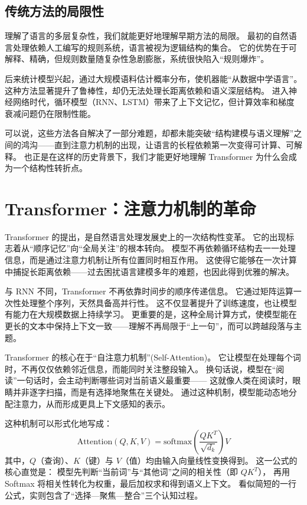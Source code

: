 \subsection{传统方法的局限性}

理解了语言的多层复杂性，我们就能更好地理解早期方法的局限。  
最初的自然语言处理依赖人工编写的规则系统，语言被视为逻辑结构的集合。  
它的优势在于可解释、精确，但规则数量随复杂性急剧膨胀，系统很快陷入“规则爆炸”。  

后来统计模型兴起，通过大规模语料估计概率分布，使机器能“从数据中学语言”。  
这种方法显著提升了鲁棒性，却仍无法处理长距离依赖和语义深层结构。  
进入神经网络时代，循环模型（RNN、LSTM）带来了上下文记忆，但计算效率和梯度衰减问题仍在限制性能。  

可以说，这些方法各自解决了一部分难题，却都未能突破“结构建模与语义理解”之间的鸿沟——直到注意力机制的出现，让语言的长程依赖第一次变得可计算、可解释。  也正是在这样的历史背景下，我们才能更好地理解 Transformer 为什么会成为一个结构性转折点。

\section{Transformer：注意力机制的革命}

Transformer 的提出，是自然语言处理发展史上的一次结构性变革。  
它的出现标志着从“顺序记忆”向“全局关注”的根本转向。  
模型不再依赖循环结构去一一处理信息，而是通过注意力机制让所有位置同时相互作用。  
这使得它能够在一次计算中捕捉长距离依赖——过去困扰语言建模多年的难题，也因此得到优雅的解决。  

与 RNN 不同，Transformer 不再依靠时间步的顺序传递信息。  
它通过矩阵运算一次性处理整个序列，天然具备高并行性。  
这不仅显著提升了训练速度，也让模型有能力在大规模数据上持续学习。  
更重要的是，这种全局计算方式，使模型能在更长的文本中保持上下文一致——理解不再局限于“上一句”，而可以跨越段落与主题。  

Transformer 的核心在于“自注意力机制”(Self-Attention)。  
它让模型在处理每个词时，不再仅仅依赖邻近信息，而能同时关注整段输入。  
换句话说，模型在“阅读”一句话时，会主动判断哪些词对当前语义最重要——  
这就像人类在阅读时，眼睛并非逐字扫描，而是有选择地聚焦在关键处。  
通过这种机制，模型能动态地分配注意力，从而形成更具上下文感知的表示。  

这种机制可以形式化地写成：  
\[
\text{Attention}(Q,K,V)=\text{softmax}\left(\frac{QK^T}{\sqrt{d_k}}\right)V
\]  
其中，$Q$（查询）、$K$（键）与 $V$（值）均由输入向量线性变换得到。  
这一公式的核心直觉是：  
模型先判断“当前词”与“其他词”之间的相关性（即 $QK^T$），  
再用 Softmax 将相关性转化为权重，最后加权求和得到语义上下文。  
看似简短的一行公式，实则包含了“选择—聚焦—整合”三个认知过程。  

